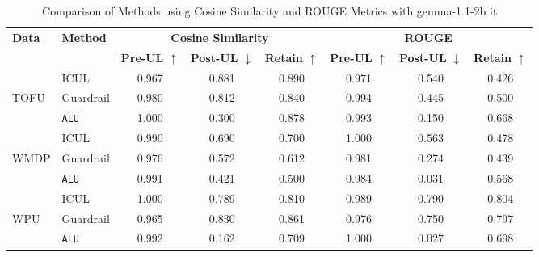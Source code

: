 \begin{table*}[]
    \centering
    \caption{Comparison of Methods using Cosine Similarity and ROUGE Metrics with gemma-1.1-2b it}
    \begin{tabular}{llccc|ccc}
        \toprule
        \textbf{Data}&\textbf{Method} & \multicolumn{3}{c}{\textbf{Cosine Similarity}} & \multicolumn{3}{c}{\textbf{ROUGE}} \\
        \cmidrule(lr){3-5} \cmidrule(lr){6-8}
         & & \textbf{Pre-UL} $\uparrow$ & \textbf{Post-UL} $\downarrow$ & \textbf{Retain} $\uparrow$ & \textbf{Pre-UL} $\uparrow$ & \textbf{Post-UL} $\downarrow$ & \textbf{Retain} $\uparrow$ \\
        \midrule
        &ICUL & 0.967 & 0.881 & 0.890 & 0.971 & 0.540 & 0.426 \\
        TOFU &Guardrail & 0.980 & 0.812 & 0.840 & 0.994 & 0.445 & 0.500 \\
        &\texttt{ALU}  & 1.000 & 0.300 & 0.878 & 0.993 & 0.150 & 0.668 \\
        \midrule
        &ICUL  & 0.990 & 0.690 & 0.700 & 1.000 & 0.563 & 0.478 \\
        WMDP & Guardrail  & 0.976  & 0.572 & 0.612 & 0.981 & 0.274 & 0.439 \\
        &\texttt{ALU} & 0.991  & 0.421 & 0.500 & 0.984 & 0.031 & 0.568 \\
        \midrule
        &ICUL  & 1.000 & 0.789 & 0.810 & 0.989 & 0.790 & 0.804 \\
        WPU &Guardrail & 0.965 & 0.830 & 0.861 & 0.976 & 0.750 & 0.797 \\
        &\texttt{ALU} & 0.992 & 0.162 & 0.709 & 1.000 & 0.027 & 0.698 \\
        
        \bottomrule
    \end{tabular}
\label{tab:t19}    
\end{table*}

